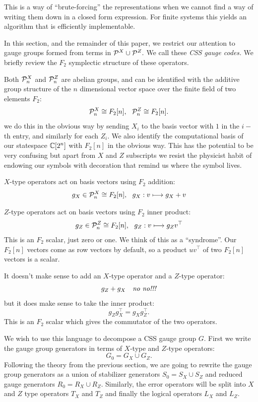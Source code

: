 \documentclass[12pt]{article}
\begin{document}
\def\Cn{\Complex[2^n]}
\def\Cr{\Complex[2^r]}
\def\Fn{F_2[n]}
\def\Fr{F_2[r]}

This is a way of ``brute-forcing'' the representations when
we cannot find a way of writing them down in a closed form expression.
For finite systems this yields an algorithm that is efficiently implementable.

In this section, and the remainder of this paper,
we restrict our
attention to gauge groups formed from terms 
in $\mathcal{P}^X\cup\mathcal{P}^Z.$
We call these \emph{CSS gauge codes.}
We briefly review the $F_2$ symplectic structure of
these operators.

Both $\mathcal{P}^X_n$ and $\mathcal{P}^Z_n$ are abelian groups,
and can be identified with the additive 
group structure of the $n$ dimensional vector space
over the finite field of two elements $F_2:$
$$
    \Pauli^X_n \cong \Fn,  \ \ 
    \Pauli^Z_n \cong \Fn. 
$$
we do this in the obvious way by sending $X_i$ to the basis vector with
$1$ in the $i-$th entry, and similarly for each $Z_i$. 
We also identify the computational basis of our statespace $\mathbb{C}[2^n]$
with $\Fn$ in the obvious way.
This has the potential to be very confusing but 
apart from $X$ and $Z$ subscripts
we resist the physicist habit of endowing our symbols with decoration that remind us where the
symbol lives.

$X$-type operators act on basis vectors using $F_2$ addition:
$$
    g_X \in \Pauli^X_n \cong \Fn, \ \ g_X : v \longmapsto g_X + v
$$

$Z$-type operators act on basis vectors using $F_2$ inner product:
$$
    g_Z \in \Pauli^Z_n \cong \Fn, \ \ g_Z : v \longmapsto g_Z v^\top
$$
This is an $F_2$ scalar, just zero or one. We think of this
as a ``syndrome''.
Our $\Fn$ vectors come as row vectors by default, so a product $u v^\top$ of
two $\Fn$ vectors is a scalar.

It doesn't make sense to add an $X$-type operator and
a $Z$-type operator:
$$
    g_Z + g_X \ \ \ \mbox{\emph{no no!!!}}
$$
but it does make sense to take the inner product:
$$
    g_Z g_X^\top = g_X g_Z^\top.
$$
This is an $F_2$ scalar which gives the commutator of the 
two operators.

We wish to use this language to decompose a CSS gauge group $G.$
First we write the gauge group generators in terms of
$X$-type and $Z$-type operators:
$$
    G_0 = G_X \cup G_Z.
$$
Following the theory from the previous section,
we are going to rewrite the gauge group generators
as a union of stabilizer generators $S_0 = S_X \cup S_Z$
and reduced gauge generators $R_0 = R_X \cup R_Z.$
Similarly, the error operators
will be split into $X$ and $Z$ type
operators $T_X$ and $T_Z$ and
finally the logical operators
$L_X$ and $L_Z.$
\end{document}
